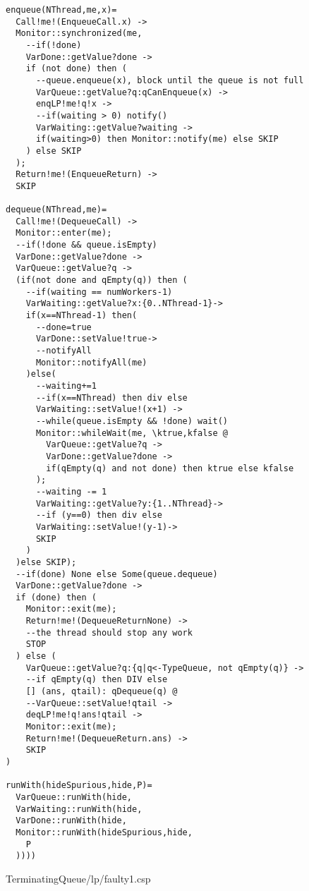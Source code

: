 \begin{lstlisting}
enqueue(NThread,me,x)=
  Call!me!(EnqueueCall.x) ->
  Monitor::synchronized(me,
    --if(!done)
    VarDone::getValue?done ->
    if (not done) then (
      --queue.enqueue(x), block until the queue is not full
      VarQueue::getValue?q:qCanEnqueue(x) ->
      enqLP!me!q!x ->
      --if(waiting > 0) notify()
      VarWaiting::getValue?waiting ->
      if(waiting>0) then Monitor::notify(me) else SKIP
    ) else SKIP
  );
  Return!me!(EnqueueReturn) ->
  SKIP
  
dequeue(NThread,me)=
  Call!me!(DequeueCall) ->
  Monitor::enter(me);
  --if(!done && queue.isEmpty)
  VarDone::getValue?done ->
  VarQueue::getValue?q ->
  (if(not done and qEmpty(q)) then (
    --if(waiting == numWorkers-1)
    VarWaiting::getValue?x:{0..NThread-1}->
    if(x==NThread-1) then(
      --done=true
      VarDone::setValue!true->
      --notifyAll
      Monitor::notifyAll(me)
    )else(
      --waiting+=1
      --if(x==NThread) then div else
      VarWaiting::setValue!(x+1) ->
      --while(queue.isEmpty && !done) wait()
      Monitor::whileWait(me, \ktrue,kfalse @
        VarQueue::getValue?q ->
        VarDone::getValue?done ->
        if(qEmpty(q) and not done) then ktrue else kfalse
      );
      --waiting -= 1
      VarWaiting::getValue?y:{1..NThread}->
      --if (y==0) then div else
      VarWaiting::setValue!(y-1)->
      SKIP
    )
  )else SKIP);
  --if(done) None else Some(queue.dequeue)
  VarDone::getValue?done ->
  if (done) then (
    Monitor::exit(me);
    Return!me!(DequeueReturnNone) ->
    --the thread should stop any work
    STOP
  ) else (
    VarQueue::getValue?q:{q|q<-TypeQueue, not qEmpty(q)} ->
    --if qEmpty(q) then DIV else
    [] (ans, qtail): qDequeue(q) @
    --VarQueue::setValue!qtail ->
    deqLP!me!q!ans!qtail ->
    Monitor::exit(me);
    Return!me!(DequeueReturn.ans) ->
    SKIP
)

runWith(hideSpurious,hide,P)=
  VarQueue::runWith(hide,
  VarWaiting::runWith(hide,
  VarDone::runWith(hide,
  Monitor::runWith(hideSpurious,hide,
    P
  ))))
\end{lstlisting}
TerminatingQueue/lp/faulty1.csp
